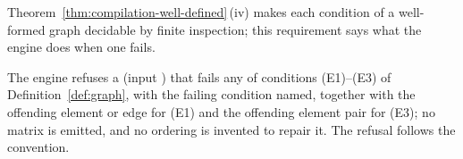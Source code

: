 
Theorem~\ref{thm:compilation-well-defined}\,(iv) makes each condition of a well-formed graph
decidable by finite inspection; this requirement says what the engine does
when one fails.

\begin{requirement}\label{req:graph-refusal}
The engine refuses a  (input )
that fails any of conditions (E1)--(E3) of Definition~\ref{def:graph}, with
the failing condition named, together with the offending element or edge
for (E1) and the offending element pair for (E3); no matrix is
emitted, and no ordering is invented to repair it. The refusal follows the
 convention.
\end{requirement}
